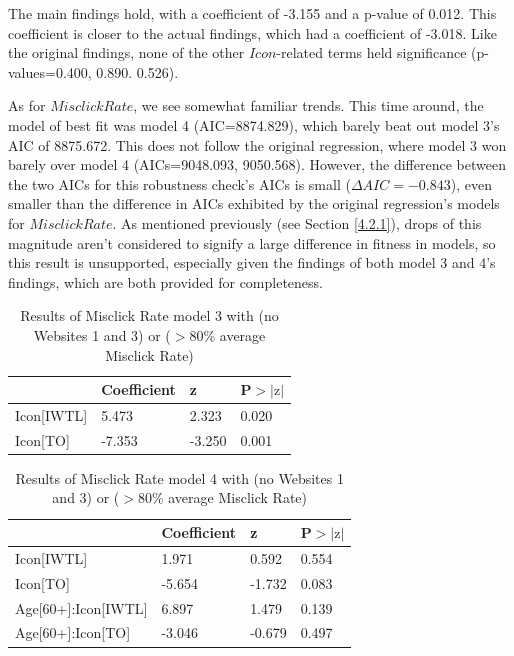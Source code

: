 \documentclass[12pt,twoside]{reedthesis}
\begin{document}
    The main findings hold, with a coefficient of -3.155 and a p-value of 0.012. This coefficient is closer to the actual findings, which had a coefficient of -3.018. Like the original findings, none of the other $Icon$-related terms held significance (p-values=0.400, 0.890. 0.526). 

    As for $Misclick Rate$, we see somewhat familiar trends. This time around, the model of best fit was model 4 (AIC=8874.829), which barely beat out model 3's AIC of 8875.672. This does not follow the original regression, where model 3 won barely over model 4 (AICs=9048.093, 9050.568). However, the difference between the two AICs for this robustness check's AICs is small ($\Delta AIC=-0.843$), even smaller than the difference in AICs exhibited by the original regression's models for $Misclick Rate$. As mentioned previously (see Section \ref{4.2.1}), drops of this magnitude aren't considered to signify a large difference in fitness in models, so this result is unsupported, especially given the findings of both model 3 and 4's findings, which are both provided for completeness.

    \begin{table}[H]
        \centering
        \begin{tabular}{| p{3.5cm} | p{2.5cm} | p{2.5cm} | p{2.5cm} |}
            \hline
            & Coefficient & z & P$>|\text{z}|$\\
            \hline
            Icon[IWTL] & 5.473 & 2.323 & 0.020\\
            \hline
            Icon[TO] & -7.353 & -3.250 & 0.001\\
            \hline
        \end{tabular}
        \caption{Results of Misclick Rate model 3 with (no Websites 1 and 3) or ($>80$\% average Misclick Rate)}
        \label{n13_80_m3_mr}
    \end{table}

    \begin{table}[H]
        \centering
        \begin{tabular}{| p{5cm} | p{2.5cm} | p{2.5cm} | p{2.5cm} |}
            \hline
            & Coefficient & z & P$>|\text{z}|$\\
            \hline
            Icon[IWTL] &  1.971 & 0.592 & 0.554\\
            \hline
            Icon[TO] &-5.654 & -1.732 &  0.083\\
            \hline
            Age[60+]:Icon[IWTL] & 6.897 & 1.479 & 0.139\\
            \hline
            Age[60+]:Icon[TO] & -3.046 & -0.679 & 0.497\\
            \hline
        \end{tabular}
        \caption{Results of Misclick Rate model 4 with (no Websites 1 and 3) or ($>80$\% average Misclick Rate)}
        \label{n13_80_m4_mr}
    \end{table}
\end{document}
